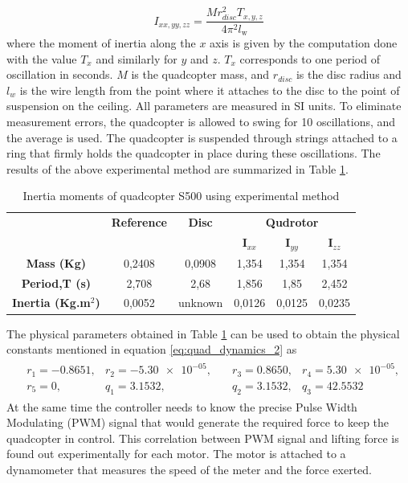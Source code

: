 \documentclass[letterpaper%
, twoside%
, 12pt%
,memoire%
, english%
,creativecommons,hyperref%
]{thETS}
\begin{document}
\begin{equation}\label{ixyz}
I_{xx,yy,zz}=\frac{Mr^2_{disc}T_{x,y,z}}{4\pi^2l_\textrm{w}}
\end{equation}
where the moment of inertia along the $x$ axis is given by the computation done with the value $T_x$ and similarly for $y$ and $z$. $T_x$ corresponds to one period of oscillation in seconds. $M$ is the quadcopter mass, and $r_{disc}$ is the disc radius and $l_w$ is the wire length from the point where it attaches to the disc to the point of suspension on the ceiling. All parameters are measured in SI units. To eliminate measurement errors, the quadcopter is allowed to swing for 10 oscillations, and the average is used. The quadcopter is suspended through strings attached to a ring that firmly holds the quadcopter in place during these oscillations. The results of the above experimental method are summarized in Table \ref{tim}. 
\begin{table} 
		\parbox{0.65\textwidth}{\caption{Inertia moments of quadcopter S500 using experimental method \citep{RN121}}\label{tim}}

		\begin{tabular}{|c|c|c|c|c|c|}
		\hline
			{\bf } & {\bf Reference} & {\bf Disc} & \multicolumn{3}{|c|}{\bf Qudrotor} \\
			\cline{4-6}
			& & & \bf I$_{xx}$ & \bf I$_{yy}$ & \bf I$_{zz}$\\
	  \hline
		\bf Mass (Kg) & 0,2408 & 0,0908 & 1,354 & 1,354 & 1,354\\
	  \hline
			\bf Period,T (s)& 2,708 & 2,68 & 1,856 & 1,85 & 2,452\\
	  \hline
			\bf Inertia (Kg.m$^2$)& 0,0052 & unknown & 0,0126 & 0,0125 & 0,0235 \\
	  \hline
		\end{tabular}
\end{table}
The physical parameters obtained in Table \ref{tim} can be used to obtain the physical constants mentioned in equation \eqref{eq:quad_dynamics_2} as
\begin{align}
\begin{aligned}
&r_{1}=-0.8651, 
&r_{2}=\num{-5.30e-05}, \quad
&r_{3}= 0.8650, 
&r_{4}= \num{5.30e-05} ,\\
&r_{5}=0, 
&q_{1}= 3.1532, \quad \quad \quad
&q_{2}= 3.1532, 
&q_{3}= 42.5532
\end{aligned}
\end{align}
At the same time the controller needs to know the precise Pulse Width Modulating (PWM) signal that would generate the required force to keep the quadcopter in control. This correlation between PWM signal and lifting force is found out experimentally for each motor. The motor is attached to a dynamometer that measures the speed of the meter and the force exerted. 
\end{document}
